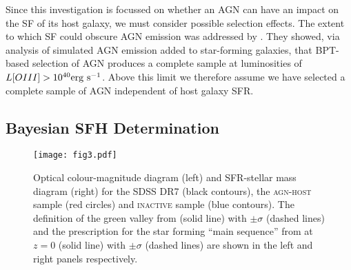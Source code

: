 \documentclass[useAMS,usenatbib]{mn2e}
\def\changed    {\color{nc} }
\def\changedbds    {\color{ncc} }
\def\newref    {\color{new} }
\begin{document}
Since this investigation is focussed on whether an AGN can have an impact on the SF of its host galaxy, we must consider {\changed possible selection effects}. The extent to which SF {\changedbds could obscure AGN} emission was addressed by \cite{Sch2010}. They showed, via analysis of simulated AGN emission added to star-forming galaxies, that BPT-based selection of AGN produces a complete sample at luminosities of $L[OIII] > 10^{40} \rm{erg~s}^{-1}$. Above this limit we therefore assume we have selected a complete sample of AGN independent of host galaxy SFR.

\subsection{Bayesian SFH Determination}\label{starpy}

\begin{figure}
\centering
\texttt{[image: fig3.pdf]}
\caption{{\newref Optical colour-magnitude diagram (left) and SFR-stellar mass diagram (right) for the SDSS DR7 (black contours), the \textsc{agn-host} sample (red circles) and \textsc{inactive} sample (blue contours). The definition of the green valley from \citet{Baldry06} (solid line) with $\pm \sigma$ (dashed lines) and the prescription for the star forming ``main sequence'' from \citet{Peng10} at $z=0$ (solid line) with $\pm \sigma$ (dashed lines) are shown in the left and right panels respectively.}}
\label{cmdsfms}
\end{figure}
\end{document}
